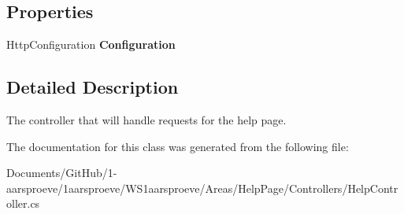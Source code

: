 \subsection*{Properties}
\begin{DoxyCompactItemize}
\item 
\hypertarget{class_w_s1aarsproeve_1_1_areas_1_1_help_page_1_1_controllers_1_1_help_controller_a67810b47daa31e488bb0ab5d5038013d}{}Http\+Configuration {\bfseries Configuration}\label{class_w_s1aarsproeve_1_1_areas_1_1_help_page_1_1_controllers_1_1_help_controller_a67810b47daa31e488bb0ab5d5038013d}

\end{DoxyCompactItemize}


\subsection{Detailed Description}
The controller that will handle requests for the help page. 



The documentation for this class was generated from the following file\+:\begin{DoxyCompactItemize}
\item 
Documents/\+Git\+Hub/1-\/aarsproeve/1aarsproeve/\+W\+S1aarsproeve/\+Areas/\+Help\+Page/\+Controllers/Help\+Controller.\+cs\end{DoxyCompactItemize}
